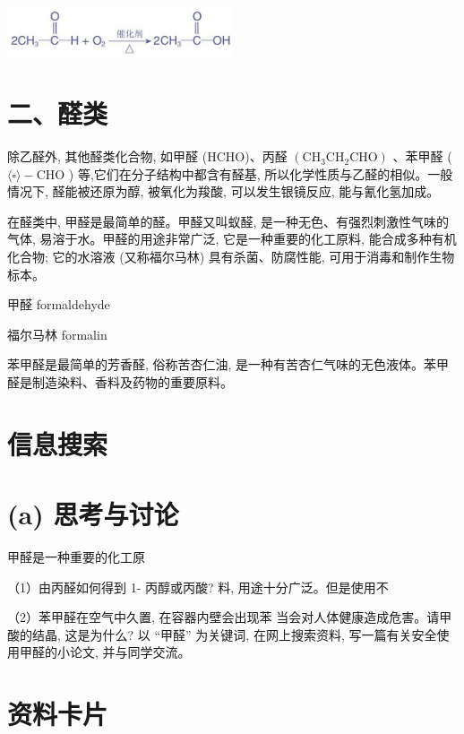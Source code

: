 \documentclass[10pt]{article}
\begin{document}
\begin{center}
\includegraphics[max width=0.5\textwidth]{images/0190efc5-b58a-7c43-bfb0-e0a030df9cfd_75_551021.jpg}
\end{center}

\section*{二、醛类}

除乙醛外, 其他醛类化合物, 如甲醛 (HCHO)、丙醛 \(\left( {{\mathrm{{CH}}}_{3}{\mathrm{{CH}}}_{2}\mathrm{{CHO}}}\right)\) 、苯甲醛 ( \(\langle \square \rangle - \mathrm{{CHO}}\) ) 等,它们在分子结构中都含有醛基, 所以化学性质与乙醛的相似。一般情况下, 醛能被还原为醇, 被氧化为羧酸, 可以发生银镜反应, 能与氰化氢加成。

在醛类中, 甲醛是最简单的醛。甲醛又叫蚁醛, 是一种无色、有强烈刺激性气味的气体, 易溶于水。甲醛的用途非常广泛, 它是一种重要的化工原料, 能合成多种有机化合物; 它的水溶液 (又称福尔马林) 具有杀菌、防腐性能, 可用于消毒和制作生物标本。

\begin{mdframed}

甲醛 formaldehyde

福尔马林 formalin

\end{mdframed}

苯甲醛是最简单的芳香醛, 俗称苦杏仁油, 是一种有苦杏仁气味的无色液体。苯甲醛是制造染料、香料及药物的重要原料。

\section*{信息搜索}

\section*{(a) 思考与讨论}

甲醛是一种重要的化工原

（1）由丙醛如何得到 1- 丙醇或丙酸? 料, 用途十分广泛。但是使用不

（2）苯甲醛在空气中久置, 在容器内壁会出现苯 当会对人体健康造成危害。请甲酸的结晶, 这是为什么? 以 “甲醛” 为关键词, 在网上搜索资料, 写一篇有关安全使用甲醛的小论文, 并与同学交流。

\section*{资料卡片}
\end{document}
